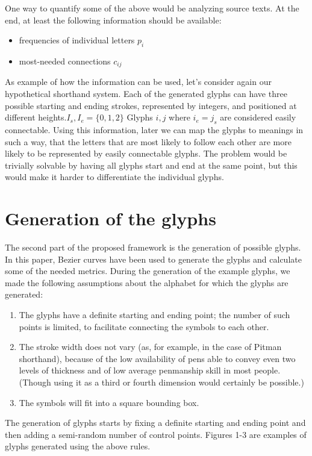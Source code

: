 \documentclass[conference]{IEEEtran}
\begin{document}
One way to quantify some of the above would be analyzing source texts. At the end, at least the following information should be available:
\begin{itemize}
        \item frequencies of individual letters \(p_i\)
        \item most-needed connections \(c_{ij}\)
\end{itemize}

As example of how the information can be used, let's consider again our hypothetical shorthand system. Each of the generated glyphs can have three possible starting and ending strokes, represented by integers, and positioned at different heights.\(I_s, I_e=\{0, 1, 2\}\) Glyphs \(i, j\) where \(i_e=j_s\) are considered easily connectable. Using this information, later we can map the glyphs to meanings in such a way, that the letters that are most likely to follow each other are more likely to be
represented by easily connectable glyphs. The problem would be trivially solvable by having all glyphs start and end at the same point, but this would make it harder to differentiate the individual glyphs.

\section{Generation of the glyphs}
The second part of the proposed framework is the generation of possible glyphs. In this paper, Bezier curves have been used to generate the glyphs and calculate some of the needed metrics.
During the generation of the example glyphs, we made the following assumptions about the alphabet for which the glyphs are generated:
\begin{enumerate}
        \item The glyphs have a definite starting and ending point; the number of such points is limited, to facilitate connecting the symbols to each other.
        \item The stroke width does not vary (as, for example, in the case of Pitman shorthand), because of the low availability of pens able to convey even two levels of thickness and of low average penmanship skill in most people. (Though using it as a third or fourth dimension would certainly be possible.)
        \item The symbols will fit into a square bounding box.
\end{enumerate}
The generation of glyphs starts by fixing a definite starting and ending point and then adding a semi-random number of control points. Figures 1-3 are examples of glyphs generated using the above rules.
\end{document}
